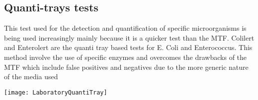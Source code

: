 \subsection{Quanti-trays tests}

This test used for the detection and quantification of specific microorganisms is being used increasingly mainly because it is a quicker test than the MTF.  Colilert and Enterolert are the quanti tray based tests for E. Coli and Enterococcus.  This method involve the use of specific enzymes and overcomes the drawbacks of the MTF which include false positives and negatives due to the more generic nature of the media used
\begin{center}
\texttt{[image: LaboratoryQuantiTray]}
\end{center}


